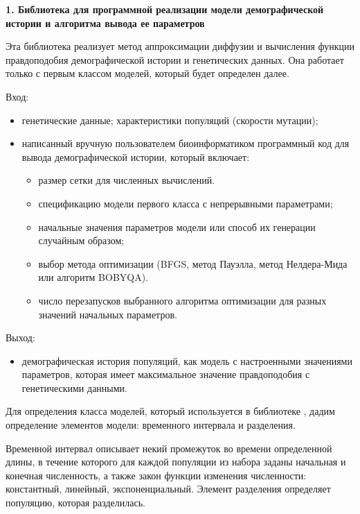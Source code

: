 \documentclass[a4paper,14pt,oneside,openany,article]{memoir}
\begin{document}
\textbf{1. Библиотека \dadi{} для программной реализации модели демографической истории и алгоритма вывода ее параметров}

Эта библиотека реализует метод аппроксимации диффузии и вычисления функции правдоподобия демографической истории и генетических данных.
Она работает только с первым классом моделей, который будет определен далее.

Вход:
\begin{itemize}
    \item генетические данные; характеристики популяций (скорости мутации);
    \item написанный вручную пользователем биоинформатиком программный код для вывода демографической истории, который включает:
    \begin{itemize}
        \item размер сетки для численных вычислений.
        \item спецификацию модели первого класса с непрерывными параметрами;
        \item начальные значения параметров модели или способ их генерации случайным образом;
        \item выбор метода оптимизации (BFGS, метод Пауэлла, метод Нелдера-Мида или алгоритм BOBYQA).
        \item число перезапусков выбранного алгоритма оптимизации для разных значений начальных параметров.
    \end{itemize}
\end{itemize}

Выход:
\begin{itemize}
    \item демографическая история популяций, как модель с настроенными значениями параметров, которая имеет максимальное значение правдоподобия с генетическими данными.\\
\end{itemize}


Для определения класса моделей, который используется в библиотеке \dadi, дадим определение элементов модели: временного интервала и разделения.

Временной интервал описывает некий промежуток во времени определенной длины, в течение которого для каждой популяции из набора заданы начальная и конечная численность, а также закон функции изменения численности: константный, линейный, экспоненциальный.
Элемент разделения определяет популяцию, которая разделилась.
\end{document}

